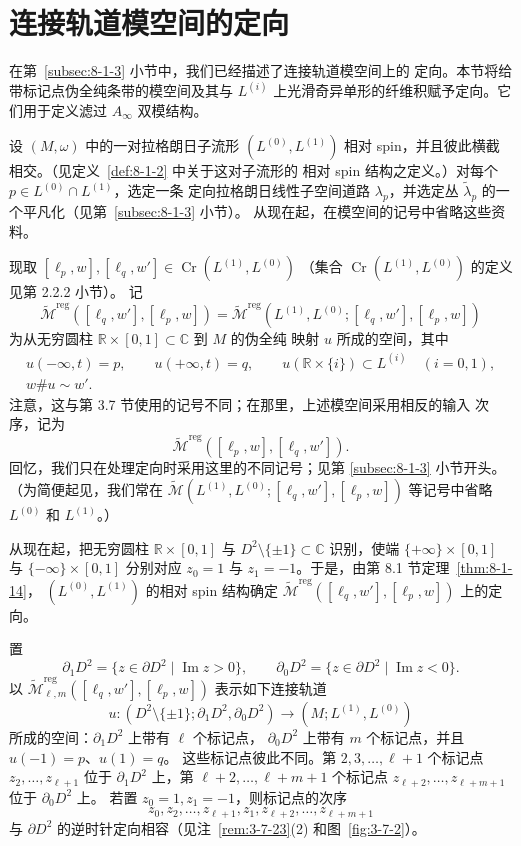 
\section{连接轨道模空间的定向}
\label{sec:8-7}

在第~\ref{subsec:8-1-3} 小节中，我们已经描述了连接轨道模空间上的
定向。本节将给带标记点伪全纯条带的模空间及其与
$L^{(i)}$ 上光滑奇异单形的纤维积赋予定向。它们用于定义滤过
$A_\infty$ 双模结构。

设 $(M,\omega)$ 中的一对拉格朗日子流形 $(L^{(0)},L^{(1)})$ 相对
spin，并且彼此横截相交。（见定义~\ref{def:8-1-2} 中关于这对子流形的
相对 spin 结构之定义。）对每个 $p\in L^{(0)}\cap L^{(1)}$，选定一条
定向拉格朗日线性子空间道路 $\lambda_p$，并选定丛
$\widetilde\lambda_p$ 的一个平凡化（见第~\ref{subsec:8-1-3} 小节）。
从现在起，在模空间的记号中省略这些资料。

现取
$[\ell_p,w],[\ell_q,w']\in\operatorname{Cr}(L^{(1)},L^{(0)})$
（集合 $\operatorname{Cr}(L^{(1)},L^{(0)})$ 的定义见第 2.2.2 小节）。
记
\[
 \widetilde{\mathcal M}^{\mathrm{reg}}
 ([\ell_q,w'],[\ell_p,w])
 =\widetilde{\mathcal M}^{\mathrm{reg}}
 (L^{(1)},L^{(0)};[\ell_q,w'],[\ell_p,w])
\]
为从无穷圆柱 $\mathbb R\times[0,1]\subset\mathbb C$ 到 $M$ 的伪全纯
映射 $u$ 所成的空间，其中
\[
 \begin{gathered}
 u(-\infty,t)=p,\qquad u(+\infty,t)=q,\qquad
 u(\mathbb R\times\{i\})\subset L^{(i)}\quad(i=0,1),\\
 w\#u\sim w'.
 \end{gathered}
\]
注意，这与第 3.7 节使用的记号不同；在那里，上述模空间采用相反的输入
次序，记为
\[
 \widetilde{\mathcal M}^{\mathrm{reg}}
 ([\ell_p,w],[\ell_q,w']).
\]
回忆，我们只在处理定向时采用这里的不同记号；见第
\ref{subsec:8-1-3} 小节开头。（为简便起见，我们常在
$\widetilde{\mathcal M}(L^{(1)},L^{(0)};
[\ell_q,w'],[\ell_p,w])$ 等记号中省略 $L^{(0)}$ 和 $L^{(1)}$。）

从现在起，把无穷圆柱 $\mathbb R\times[0,1]$ 与
$D^2\setminus\{\pm1\}\subset\mathbb C$ 识别，使端
$\{+\infty\}\times[0,1]$ 与 $\{-\infty\}\times[0,1]$ 分别对应
$z_0=1$ 与 $z_1=-1$。于是，由第 8.1 节定理~\ref{thm:8-1-14}，
$(L^{(0)},L^{(1)})$ 的相对 spin 结构确定
$\widetilde{\mathcal M}^{\mathrm{reg}}
([\ell_q,w'],[\ell_p,w])$ 上的定向。

置
\[
 \partial_1D^2=\{z\in\partial D^2\mid\operatorname{Im}z>0\},
 \qquad
 \partial_0D^2=\{z\in\partial D^2\mid\operatorname{Im}z<0\}.
\]
以
$\widetilde{\mathcal M}^{\mathrm{reg}}_{\ell,m}
([\ell_q,w'],[\ell_p,w])$
表示如下连接轨道
\[
 u\colon(D^2\setminus\{\pm1\};\partial_1D^2,\partial_0D^2)
 \longrightarrow(M;L^{(1)},L^{(0)})
\]
所成的空间：$\partial_1D^2$ 上带有 $\ell$ 个标记点，
$\partial_0D^2$ 上带有 $m$ 个标记点，并且 $u(-1)=p$、$u(1)=q$。
这些标记点彼此不同。第 $2,3,\ldots,\ell+1$ 个标记点
$z_2,\ldots,z_{\ell+1}$ 位于 $\partial_1D^2$ 上，第
$\ell+2,\ldots,\ell+m+1$ 个标记点
$z_{\ell+2},\ldots,z_{\ell+m+1}$ 位于 $\partial_0D^2$
上。
若置 $z_0=1,z_1=-1$，则标记点的次序
\[
 z_0,z_2,\ldots,z_{\ell+1},z_1,z_{\ell+2},\ldots,z_{\ell+m+1}
\]
与 $\partial D^2$ 的逆时针定向相容（见注~\ref{rem:3-7-23}(2)
和图~\ref{fig:3-7-2}）。

